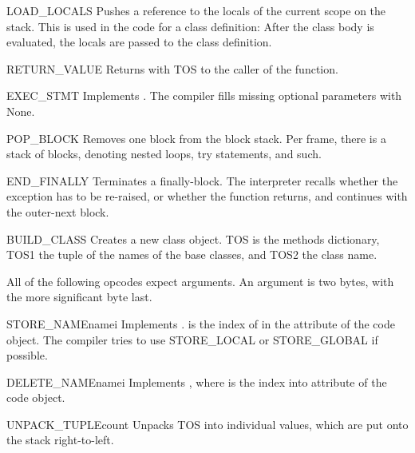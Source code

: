 \begin{funcdesc}{LOAD_LOCALS}{}
Pushes a reference to the locals of the current scope on the stack.
This is used in the code for a class definition: After the class body
is evaluated, the locals are passed to the class definition.
\end{funcdesc}

\begin{funcdesc}{RETURN_VALUE}{}
Returns with TOS to the caller of the function.
\end{funcdesc}

\begin{funcdesc}{EXEC_STMT}{}
Implements .  The compiler fills
missing optional parameters with None.
\end{funcdesc}

\begin{funcdesc}{POP_BLOCK}{}
Removes one block from the block stack.  Per frame, there is a 
stack of blocks, denoting nested loops, try statements, and such.
\end{funcdesc}

\begin{funcdesc}{END_FINALLY}{}
Terminates a finally-block.  The interpreter recalls whether the
exception has to be re-raised, or whether the function returns,
and continues with the outer-next block.
\end{funcdesc}

\begin{funcdesc}{BUILD_CLASS}{}
Creates a new class object.  TOS is the methods dictionary, TOS1
the tuple of the names of the base classes, and TOS2 the class name.
\end{funcdesc}

All of the following opcodes expect arguments.  An argument is two
bytes, with the more significant byte last.

\begin{funcdesc}{STORE_NAME}{namei}
Implements .  is the index of 
in the attribute  of the code object.
The compiler tries to use STORE_LOCAL or STORE_GLOBAL if possible.
\end{funcdesc}

\begin{funcdesc}{DELETE_NAME}{namei}
Implements , where  is the index into
 attribute of the code object.
\end{funcdesc}

\begin{funcdesc}{UNPACK_TUPLE}{count}
Unpacks TOS into  individual values, which are put onto
the stack right-to-left.
\end{funcdesc}

